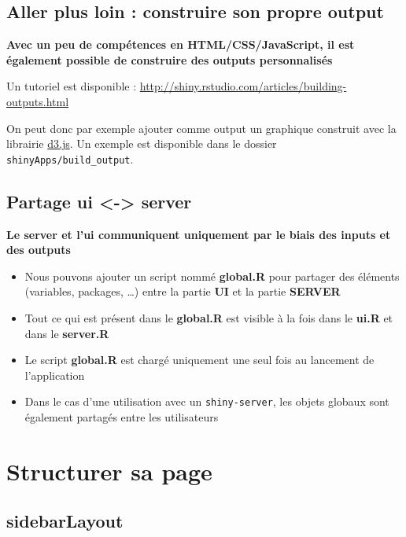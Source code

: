 \documentclass[
]{article}
\begin{document}
\hypertarget{aller-plus-loin-construire-son-propre-output}{%
\subsection{Aller plus loin : construire son propre
output}\label{aller-plus-loin-construire-son-propre-output}}

\textbf{Avec un peu de compétences en HTML/CSS/JavaScript, il est
également possible de construire des outputs personnalisés}

Un tutoriel est disponible :
\url{http://shiny.rstudio.com/articles/building-outputs.html}

On peut donc par exemple ajouter comme output un graphique construit
avec la librairie \href{https://d3js.org/}{d3.js}. Un exemple est
disponible dans le dossier \texttt{shinyApps/build\_output}.

\hypertarget{partage-ui---server}{%
\subsection{Partage ui \textless-\textgreater{}
server}\label{partage-ui---server}}

\textbf{Le server et l'ui communiquent uniquement par le biais des
inputs et des outputs}

\begin{itemize}
\item
  Nous pouvons ajouter un script nommé \textbf{global.R} pour partager
  des éléments (variables, packages, \ldots) entre la partie \textbf{UI}
  et la partie \textbf{SERVER}
\item
  Tout ce qui est présent dans le \textbf{global.R} est visible à la
  fois dans le \textbf{ui.R} et dans le \textbf{server.R}
\item
  Le script \textbf{global.R} est chargé uniquement une seul fois au
  lancement de l'application
\item
  Dans le cas d'une utilisation avec un \texttt{shiny-server}, les
  objets globaux sont également partagés entre les utilisateurs
\end{itemize}

\hypertarget{structurer-sa-page}{%
\section{Structurer sa page}\label{structurer-sa-page}}

\hypertarget{sidebarlayout}{%
\subsection{sidebarLayout}\label{sidebarlayout}}
\end{document}
